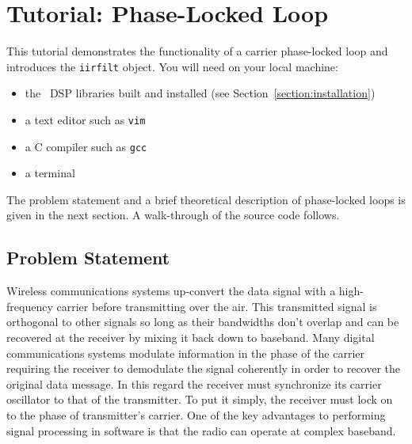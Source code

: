 % 
%

\newpage
\section{Tutorial: Phase-Locked Loop}
\label{tutorial:pll}
This tutorial demonstrates the functionality of a carrier phase-locked
loop and introduces the {\tt iirfilt} object.
%
You will need on your local machine:
\begin{itemize}
\item the \liquid\ DSP libraries built and installed (see
      Section~\ref{section:installation})
\item a text editor such as {\tt vim} \cite{vim:web}
\item a C compiler such as {\tt gcc} \cite{gcc:web}
\item a terminal
\end{itemize}
%
The problem statement and a brief theoretical description of
phase-locked loops is given in the next section.
A walk-through of the source code follows.

\subsection{Problem Statement}
\label{tutorial:pll:problem}
Wireless communications systems up-convert the data signal with
a high-frequency carrier before transmitting over the air.
This transmitted signal is orthogonal to other signals so long as
their bandwidths don't overlap and can be recovered at the receiver by
mixing it back down to baseband.
Many digital communications systems modulate information in the phase of
the carrier requiring the receiver to demodulate the signal coherently
in order to recover the original data message.
In this regard the receiver must synchronize its carrier oscillator to
that of the transmitter.
To put it simply, the receiver must lock on to the phase of
transmitter's carrier.
One of the key advantages to performing signal processing in software is
that the radio can operate at complex baseband.

